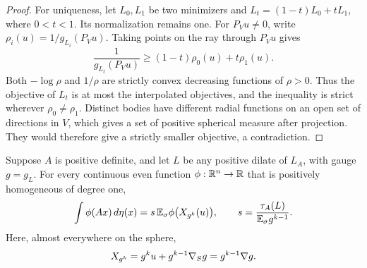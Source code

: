 \begin{proof}
For uniqueness, let $L_0,L_1$ be two minimizers and
$L_t=(1-t)L_0+tL_1$, where $0<t<1$. Its normalization remains one.
For $P_Vu\ne0$, write $\rho_i(u)=1/g_{L_i}(P_Vu)$.
Taking points on the ray through $P_Vu$ gives
\[
 \frac{1}{g_{L_t}(P_Vu)}
 \ge (1-t)\rho_0(u)+t\rho_1(u).
\]
Both $-\log\rho$ and $1/\rho$ are strictly convex decreasing
functions of $\rho>0$. Thus the objective of $L_t$ is at most the
interpolated objectives, and the inequality is strict wherever
$\rho_0\ne\rho_1$. Distinct bodies have different radial functions
on an open set of directions in $V$, which gives a set of positive
spherical measure after projection. They would therefore give a
strictly smaller objective, a contradiction.
\end{proof}

\begin{proposition}\label{prop:representation}
Suppose $A$ is positive definite, and let $L$ be any positive dilate
of $L_A$, with gauge $g=g_L$. For every continuous even function
$\phi:\mathbb R^n\to\mathbb R$ that is positively homogeneous of degree one,
\begin{equation}\label{eq:representation}
 \int\phi(Ax)\,d\eta(x)
 =s\,\mathbb E_{\sigma}\phi\bigl(X_{g^k}(u)\bigr),
 \qquad
 s=\frac{\tau_A(L)}{\mathbb E_{\sigma} g^{k-1}}.
\end{equation}
Here, almost everywhere on the sphere,
\begin{equation}\label{eq:norm-power-field}
 X_{g^k}=g^ku+g^{k-1}\nabla_S g=g^{k-1}\nabla g.
\end{equation}
\end{proposition}

